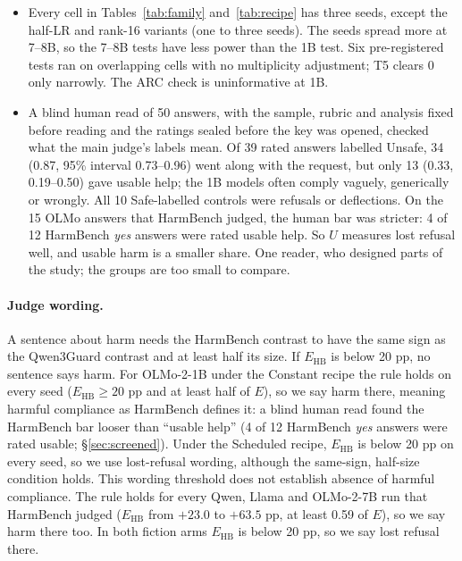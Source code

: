 \documentclass{article}
\newcommand{\Ehb}{E_{\mathrm{HB}}}
\begin{document}
\begin{itemize}
  \item Every cell in Tables~\ref{tab:family} and~\ref{tab:recipe} has three
        seeds, except the half-LR and rank-16 variants (one to three seeds). The seeds spread more at 7--8B, so the
        7--8B tests have less power than the 1B test. Six pre-registered tests
        ran on overlapping cells with no multiplicity adjustment; T5 clears 0
        only narrowly. The ARC check is uninformative at 1B.
  \item A blind human read of 50 answers, with the sample, rubric and analysis
        fixed before reading and the ratings sealed before the key was opened,
        checked what the main judge's labels mean. Of 39 rated answers labelled
        Unsafe, 34 (0.87, 95\% interval 0.73--0.96) went along with the request,
        but only 13 (0.33, 0.19--0.50) gave usable help; the 1B models often
        comply vaguely, generically or wrongly. All 10 Safe-labelled controls
        were refusals or deflections. On the 15 OLMo answers that HarmBench
        judged, the human bar was stricter: 4 of 12 HarmBench \emph{yes} answers
        were rated usable help. So $U$ measures lost refusal well, and usable
        harm is a smaller share. One reader, who designed parts of the study;
        the groups are too small to compare.
\end{itemize}

\paragraph{Judge wording.} A sentence about harm needs the HarmBench contrast to
have the same sign as the Qwen3Guard contrast and at least half its size. If
$\Ehb$ is below 20 pp, no sentence says harm. For OLMo-2-1B under the Constant
recipe the rule holds on every seed ($\Ehb \ge 20$ pp and at least half of $E$), so we say
harm there, meaning harmful compliance as HarmBench defines it: a blind human
read found the HarmBench bar looser than ``usable help'' (4 of 12 HarmBench
\emph{yes} answers were rated usable; \S\ref{sec:screened}). Under the
Scheduled recipe, $\Ehb$ is below 20 pp on every seed, so we use lost-refusal
wording, although the same-sign, half-size condition holds. This wording
threshold does not establish absence of harmful compliance. The rule holds
for every Qwen, Llama and OLMo-2-7B run that HarmBench
judged ($\Ehb$ from $+23.0$ to $+63.5$ pp, at least 0.59 of $E$), so we say
harm there too. In both fiction arms $\Ehb$ is below 20 pp, so we say lost
refusal there.
\end{document}
